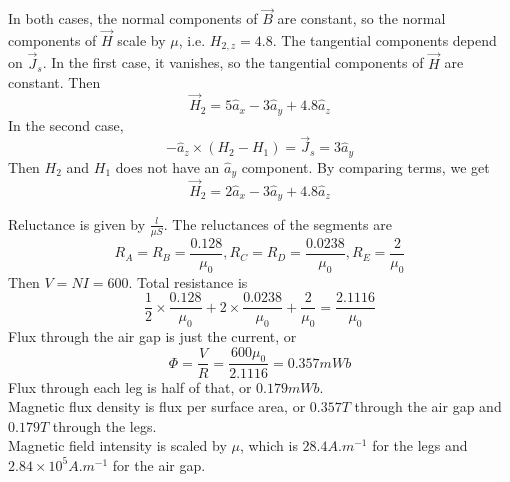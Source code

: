 \documentclass[answers]{exam}
\begin{document}
\begin{questions}
\begin{solution}
    In both cases, the normal components of $\vec B$ are constant, so the normal components of $\vec H$ scale by $\mu$, i.e. $H_{2,z} = 4.8$. The tangential components depend on $\vec J_s$. In the first case, it vanishes, so the tangential components of $\vec H$ are constant. Then
    $$\vec H_2 = 5\hat a_x - 3\hat a_y + 4.8\hat a_z$$
    In the second case,
    $$-\hat a_z \times (H_2 - H_1) = \vec J_s = 3\hat a_y$$
    Then $H_2$ and $H_1$ does not have an $\hat a_y$ component. By comparing terms, we get
    $$\vec H_2 = 2\hat a_x - 3\hat a_y + 4.8 \hat a_z$$
\end{solution}


\begin{solution}
    Reluctance is given by $\frac{l}{\mu S}$. The reluctances of the segments are
    $$R_A = R_B = \frac{0.128}{\mu_0}, R_C = R_D = \frac{0.0238}{\mu_0}, R_E = \frac{2}{\mu_0}$$
    Then $V=NI=600$. Total resistance is
    $$\frac{1}{2} \times \frac{0.128}{\mu_0} + 2 \times \frac{0.0238}{\mu_0} + \frac{2}{\mu_0} = \frac{2.1116}{\mu_0}$$
    Flux through the air gap is just the current, or
    $$\Phi = \frac{V}{R} = \frac{600\mu_0}{2.1116} = 0.357\unit{mWb}$$
    Flux through each leg is half of that, or $0.179\unit{mWb}$. \\
    Magnetic flux density is flux per surface area, or $0.357\unit{T}$ through the air gap and $0.179\unit{T}$ through the legs. \\
    Magnetic field intensity is scaled by $\mu$, which is $28.4\unit{A.m^{-1}}$ for the legs and $2.84\times10^5\unit{A.m^{-1}}$ for the air gap.
\end{solution}



\end{questions}
\end{document}

